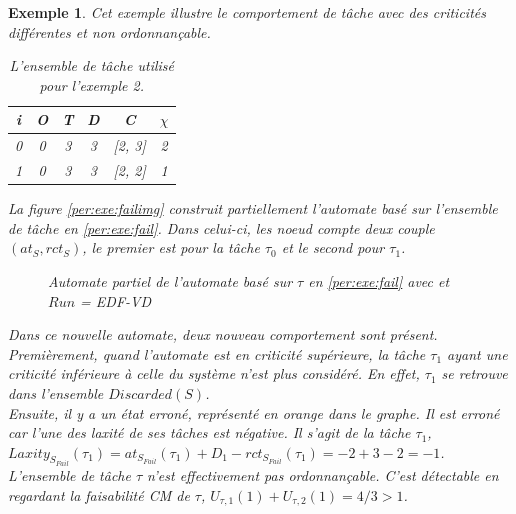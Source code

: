 \documentclass[12pt,a4paper,oneside]{book}
\theoremstyle{break}
\newtheorem{exem}{Exemple}[chapter]
\theoremstyle{breakplain}
\begin{document}
\begin{exem}

Cet exemple illustre le comportement de tâche avec des criticités différentes et non ordonnançable.

\begin{table}[h]

    \centering

\begin{tabular}{|c|c|c|c|c|c|}
\hline
i &O & T & D & C & $\chi$\\
\hline
0 & 0 & 3 & 3 & [2, 3]& 2\\
\hline
1 & 0 & 3 & 3 & [2, 2]& 1\\
\hline
\end{tabular}
    
\caption{L'ensemble de tâche utilisé pour l'exemple 2.}
\label{per:exe:fail}

\end{table}

La figure \autoref{per:exe:failimg} construit partiellement l'automate basé sur l'ensemble de tâche en \autoref{per:exe:fail}. Dans celui-ci, les noeud compte deux couple $(at_S, rct_S)$, le premier est pour la tâche $\tau_0$ et le second pour $\tau_1$.

\begin{figure}[h]

    \centering
    
    \resizebox{\textwidth}{!}{}
    
\caption{Automate partiel de l'automate basé sur $\tau$ en \autoref{per:exe:fail} avec et $Run$ = EDF-VD}
\label{per:exe:failimg}

\end{figure}

Dans ce nouvelle automate, deux nouveau comportement sont présent.\\
Premièrement, quand l'automate est en criticité supérieure, la tâche $\tau_1$ ayant une criticité inférieure à celle du système n'est plus considéré. En effet, $\tau_1$ se retrouve dans l'ensemble $Discarded(S)$.\\
Ensuite, il y a un état erroné, représenté en orange dans le graphe. Il est erroné car l'une des laxité de ses tâches est négative. Il s'agit de la tâche $\tau_1$, $Laxity_{S_{Fail}}(\tau_1) = at_{S_{Fail}}(\tau_1) + D_1 - rct_{S_{Fail}}(\tau_1) = -2 +3-2 = -1$. L'ensemble de tâche $\tau$ n'est effectivement pas ordonnançable. C'est détectable en regardant la faisabilité CM de $\tau$, $U_{\tau, 1}(1) + U_{\tau, 2}(1)= 4/3 >1$.

\end{exem}
\end{document}
